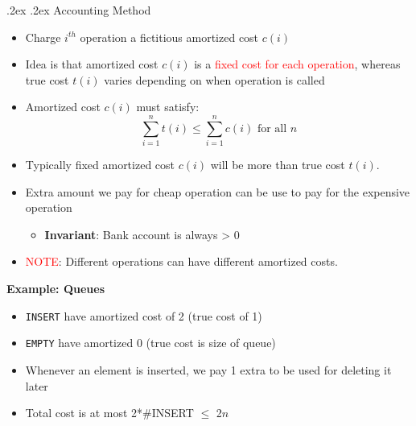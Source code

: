 \documentclass[10pt,landscape,a4paper]{article}
\makeatletter
\renewcommand{\subsubsection}{\@startsection{subsubsection}{1}{0mm}%
    {.2ex}%
    {.2ex}%
    {\rmfamily\bfseries}}
\makeatother
\begin{document}
\begin{multicols*}{4}
	\subsubsection{Accounting Method}
	\begin{itemize}
		\item Charge $i^{th}$ operation a fictitious amortized cost $c(i)$
		\item Idea is that amortized cost $c(i)$ is a \textcolor{red}{fixed cost for each operation}, whereas true cost $t(i)$ varies depending on when operation is called
		\item Amortized cost $c(i)$ must satisfy:
		\[\sum_{i=1}^{n}t(i)\leq\sum_{i=1}^{n}c(i) \text{ for all } n\] 
		\item Typically fixed amortized cost $c(i)$ will be more than true cost $t(i)$. 
		\item Extra amount we pay for cheap operation can be use to pay for the expensive operation
		\begin{itemize}
			\item \textbf{Invariant}: Bank account is always > 0
		\end{itemize}
		\item \textcolor{red}{NOTE}: Different operations can have different amortized costs.
	\end{itemize}
	\textbf{Example: Queues}
	\begin{itemize}
		\item \texttt{INSERT} have amortized cost of 2 (true cost of 1)
		\item \texttt{EMPTY} have amortized 0 (true cost is size of queue)
		\item Whenever an element is inserted, we pay 1 extra to be used for deleting it later
		\item Total cost is at most 2*\#INSERT $\leq$ 2$n$
	\end{itemize}
	\vfill\null\columnbreak

\end{multicols*}
\end{document}
